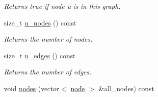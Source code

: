 \begin{DoxyCompactItemize}
\begin{DoxyCompactList}\small\item\em Returns true if node {\itshape u} is in this graph. \end{DoxyCompactList}\item 
size\-\_\-t \hyperlink{classlgraph_1_1utils_1_1xxgraph_ad345f1fbf1dee34e1579b5aea9aef9b2}{n\-\_\-nodes} () const 
\begin{DoxyCompactList}\small\item\em Returns the number of nodes. \end{DoxyCompactList}\item 
size\-\_\-t \hyperlink{classlgraph_1_1utils_1_1xxgraph_af3f7c3835406c2cbf70479ae1c0253c9}{n\-\_\-edges} () const 
\begin{DoxyCompactList}\small\item\em Returns the number of edges. \end{DoxyCompactList}\item 
\hypertarget{classlgraph_1_1utils_1_1xxgraph_a99f83387aa9f59b861e675251be5a3ad}{void \hyperlink{classlgraph_1_1utils_1_1xxgraph_a99f83387aa9f59b861e675251be5a3ad}{nodes} (vector$<$ \hyperlink{namespacelgraph_1_1utils_a7bd66ede3805ef121bc2835bd48de0cf}{node} $>$ \&all\-\_\-nodes) const }\label{classlgraph_1_1utils_1_1xxgraph_a99f83387aa9f59b861e675251be5a3ad}


\end{DoxyCompactItemize}
